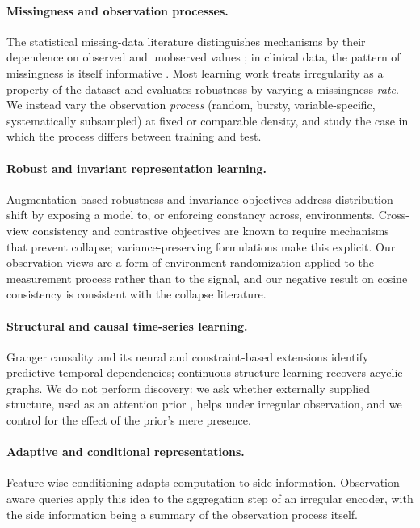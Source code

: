 \documentclass[sigconf,nonacm]{acmart}
\begin{document}
\paragraph{Missingness and observation processes.}
The statistical missing-data literature distinguishes mechanisms by their dependence on observed and unobserved
values \cite{rubin1976missing}; in clinical data, the pattern of missingness is itself informative
\cite{lipton2016informative,che2018grud}. Most learning work treats irregularity as a property of the dataset
and evaluates robustness by varying a missingness \emph{rate}. We instead vary the observation \emph{process}
(random, bursty, variable-specific, systematically subsampled) at fixed or comparable density, and study the case
in which the process differs between training and test.

\paragraph{Robust and invariant representation learning.}
Augmentation-based robustness \cite{tobin2017domainrand,wen2021augmentation} and invariance objectives
\cite{arjovsky2019irm} address distribution shift by exposing a model to, or enforcing constancy across,
environments. Cross-view consistency and contrastive objectives \cite{chen2020simclr,grill2020byol} are known to
require mechanisms that prevent collapse; variance-preserving formulations \cite{bardes2022vicreg} make this
explicit. Our observation views are a form of environment randomization applied to the measurement process
rather than to the signal, and our negative result on cosine consistency is consistent with the collapse
literature.

\paragraph{Structural and causal time-series learning.}
Granger causality \cite{granger1969} and its neural and constraint-based extensions
\cite{tank2021neuralgranger,runge2019pcmci} identify predictive temporal dependencies; continuous structure
learning \cite{zheng2018notears} recovers acyclic graphs. We do not perform discovery: we ask whether externally
supplied structure, used as an attention prior \cite{vaswani2017attention}, helps under irregular observation, and
we control for the effect of the prior's mere presence.

\paragraph{Adaptive and conditional representations.}
Feature-wise conditioning \cite{perez2018film} adapts computation to side information. Observation-aware queries
apply this idea to the aggregation step of an irregular encoder, with the side information being a summary of the
observation process itself.
\end{document}

